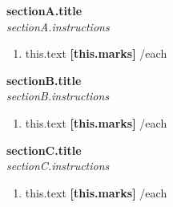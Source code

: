 \documentclass[12pt,a4paper]{article}
\begin{document}
\vspace*{1cm}
\begin{center}
    \textbf{\Large {{sectionA.title}}} \\
    \vspace{0.2cm}
    \textit{ {{sectionA.instructions}} }
\end{center}
\vspace{1cm}

\begin{enumerate}[label=\textbf{\arabic*.}, leftmargin=*]
    {{#each sectionA.questions}}
    \item {{this.text}} \hfill \textbf{[{{this.marks}}]}
    \vspace{0.5cm}
    {{/each}}
\end{enumerate}

\vspace{1cm}

\vspace*{1cm}
\begin{center}
    \textbf{\Large {{sectionB.title}}} \\
    \vspace{0.2cm}
    \textit{ {{sectionB.instructions}} }
\end{center}
\vspace{1cm}

\begin{enumerate}[label=\textbf{\arabic*.}, leftmargin=*, resume]
    {{#each sectionB.questions}}
    \item {{this.text}} \hfill \textbf{[{{this.marks}}]}
    \vspace{0.5cm}
    {{/each}}
\end{enumerate}

\vspace{1cm}

\vspace*{1cm}
\begin{center}
    \textbf{\Large {{sectionC.title}}} \\
    \vspace{0.2cm}
    \textit{ {{sectionC.instructions}} }
\end{center}
\vspace{1cm}

\begin{enumerate}[label=\textbf{\arabic*.}, leftmargin=*, resume]
    {{#each sectionC.questions}}
    \item {{this.text}} \hfill \textbf{[{{this.marks}}]}
    \vspace{0.5cm}
    {{/each}}
\end{enumerate}
\end{document}

